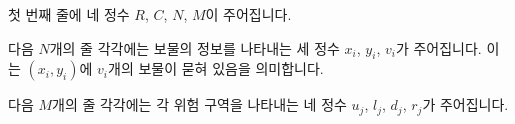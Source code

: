 첫 번째 줄에 네 정수 $R$, $C$, $N$, $M$이 주어집니다.

다음 $N$개의 줄 각각에는 보물의 정보를 나타내는 세 정수 $x_i$, $y_i$, $v_i$가 주어집니다. 이는 $(x_i, y_i)$에 $v_i$개의 보물이 묻혀 있음을 의미합니다.

다음 $M$개의 줄 각각에는 각 위험 구역을 나타내는 네 정수 $u_j$, $l_j$, $d_j$, $r_j$가 주어집니다.